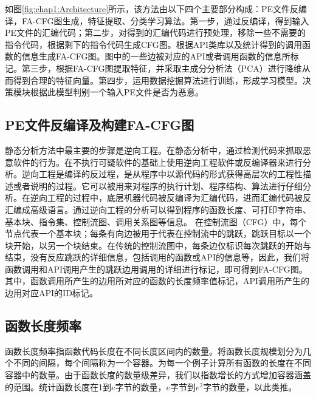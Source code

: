 如图\ref{fig:chap1:Architecture}所示，该方法由以下四个主要部分构成：PE文件反编译，FA-CFG图生成，特征提取、分类学习算法。第一步，通过反编译，得到输入PE文件的汇编代码；第二步，对得到的汇编代码进行预处理，移除一些不需要的指令代码，根据剩下的指令代码生成CFG图。根据API类库以及统计得到的调用函数的信息生成FA-CFG图。图中的一些边被对应的API或者调用函数的信息所标记。第三步，根据FA-CFG图提取特征，并采取主成分分析法（PCA）进行降维从而得到合理的特征向量。第四步，运用数据挖掘算法进行训练，形成学习模型。决策模块根据此模型判别一个输入PE文件是否为恶意。
\subsection{PE文件反编译及构建FA-CFG图}
静态分析方法中最主要的步骤是逆向工程。在静态分析中，通过检测代码来抓取恶意软件的行为。在不执行可疑软件的基础上使用逆向工程软件或反编译器来进行分析。逆向工程是编译的反过程，是从程序中以源代码的形式获得高层次的工程性描述或者说明的过程。它可以被用来对程序的执行计划、程序结构、算法进行仔细分析。在逆向工程的过程中，底层机器代码被反编译为汇编代码，进而汇编代码被反汇编成高级语言。通过逆向工程的分析可以得到程序的函数长度、可打印字符串、基本块、指令集、控制流图、调用关系图等信息。
在控制流图（CFG）中，每个节点代表一个基本块；每条有向边被用于代表在控制流中的跳跃，跳跃目标以一个块开始，以另一个块结束。在传统的控制流图中，每条边仅标识每次跳跃的开始与结束，没有反应跳跃的详细信息，包括调用的函数或API的信息等，因此，我们将函数调用和API调用产生的跳跃边用调用的详细进行标记，即可得到FA-CFG图。其中，函数调用所产生的边用所对应的函数的长度频率值标记，API调用所产生的边用对应API的ID标记。
\subsection{函数长度频率}
函数长度频率指函数代码长度在不同长度区间内的数量。将函数长度规模划分为几个不同的间隔，每个间隔称为一个容器。为每一个例子计算所有函数的长度在不同容器中的数量。由于函数长度的数量级差异，我们以指数增长的方式增加容器涵盖的范围。统计函数长度在1到$e$字节的数量，$e$字节到$e^{2}$字节的数量，以此类推。
